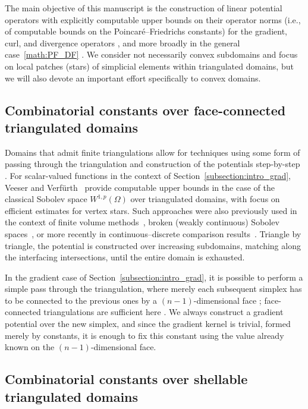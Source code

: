 \documentclass[10pt,a4paper]{article}
\newcommand\cye[1]{%
\protect\leavevmode
\begingroup
    \color{blue}%
    #1%
\endgroup
}
\begin{document}
The main objective of this manuscript is the construction of linear potential operators with explicitly computable upper bounds on their operator norms (i.e., of computable bounds on the Poincar\'e--Friedrichs constants) for the gradient, curl, and divergence operators\cye{, and more broadly in the general case~\eqref{math:PF_DF}}. 
\cye{We consider not necessarily} convex subdomains and focus on \cye{local patches (stars) of simplicial elements within triangulated domains, but we will also devote an important effort specifically to} convex domains. 

\subsection{Combinatorial constants over face-connected triangulated domains}

Domains that admit finite triangulations allow for techniques \cye{using some form of passing through the triangulation and construction of the potentials step-by-step}. For scalar-valued functions in the context of Section~\ref{subsection:intro_grad}, Veeser and Verf\"urth~\cite{veeser2012poincare} provide computable upper bounds in the case of the classical Sobolev space $W^{1,p}(\Omega)$ over triangulated domains, with focus on efficient estimates for \cye{vertex} stars. 
Such approaches were also previously used in the context of finite volume methods~\cite{Eym_Gal_Her_00}, broken (weakly continuous) Sobolev spaces~\cite{vohralik2005discrete}, or more recently in continuous--discrete comparison results~\cite{Brae_Pill_Sch_p_rob_09, ern2020stable, Chaum_Voh_p_rob_3D_H_curl_24,  Voh_loc_glob_H1_24}. Triangle by triangle, the potential is constructed over increasing subdomains, matching along the interfacing intersections, until the entire domain is exhausted.  

In the gradient case of Section~\ref{subsection:intro_grad}, it is possible to perform a simple pass through the triangulation, where merely each subsequent simplex has to be connected to the previous ones by a $(n-1)$-dimensional face\cye{; face-connected triangulations are sufficient here}. We always construct a gradient potential over the new simplex, and since the gradient kernel is trivial, formed merely by constants, it is enough to fix this constant using the value already known on the $(n-1)$-dimensional face.

\subsection{Combinatorial constants over shellable triangulated domains}
\end{document}
